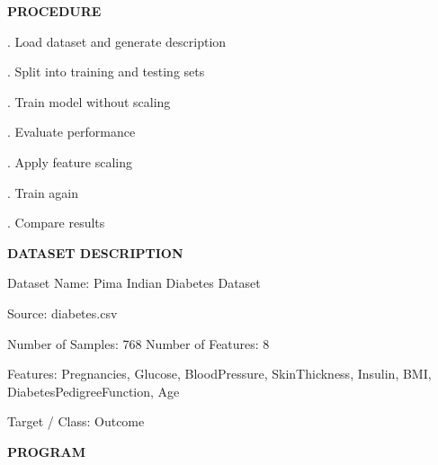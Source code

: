 \documentclass[11pt,twoside]{article}
\newcommand{\expheading}[1]{{\fontsize{14}{17}\selectfont\textbf{#1}\par}}
\newcommand{\toevenpage}{\clearpage\ifodd\value{page}\null\thispagestyle{empty}\newpage\fi}
\begin{document}
{\expheading{PROCEDURE}
\vspace{4pt}
. Load dataset and generate description\par
{}. Split into training and testing sets\par
{}. Train model without scaling\par
{}. Evaluate performance\par
{}. Apply feature scaling\par
{}. Train again\par
{}. Compare results \par
\vspace{4pt}

\expheading{DATASET DESCRIPTION}
\vspace{4pt}
\noindent Dataset Name: Pima Indian Diabetes Dataset\par
\noindent Source: diabetes.csv\par
\noindent Number of Samples: 768 \hspace{0.3cm} Number of Features: 8\par
\noindent Features: Pregnancies, Glucose, BloodPressure, SkinThickness, Insulin, BMI, DiabetesPedigreeFunction, Age\par
\noindent Target / Class: Outcome \par
\vspace{4pt}
} %
\toevenpage
\expheading{PROGRAM}
\vspace{6pt}
\end{document}
